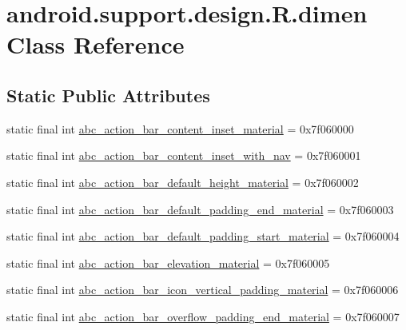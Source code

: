 \hypertarget{classandroid_1_1support_1_1design_1_1R_1_1dimen}{}\section{android.\+support.\+design.\+R.\+dimen Class Reference}
\label{classandroid_1_1support_1_1design_1_1R_1_1dimen}
\subsection*{Static Public Attributes}
\begin{DoxyCompactItemize}
\item 
static final int \mbox{\hyperlink{classandroid_1_1support_1_1design_1_1R_1_1dimen_af42ca9b71c928b25b27c7037a575693b}{abc\+\_\+action\+\_\+bar\+\_\+content\+\_\+inset\+\_\+material}} = 0x7f060000
\item 
static final int \mbox{\hyperlink{classandroid_1_1support_1_1design_1_1R_1_1dimen_ade3bf521e9059c2181c240a1ad284b46}{abc\+\_\+action\+\_\+bar\+\_\+content\+\_\+inset\+\_\+with\+\_\+nav}} = 0x7f060001
\item 
static final int \mbox{\hyperlink{classandroid_1_1support_1_1design_1_1R_1_1dimen_ab992b60379bc68bf6d348760955ad8a6}{abc\+\_\+action\+\_\+bar\+\_\+default\+\_\+height\+\_\+material}} = 0x7f060002
\item 
static final int \mbox{\hyperlink{classandroid_1_1support_1_1design_1_1R_1_1dimen_a25e4e04e667bdfbbf4bcdbced1b7d1b4}{abc\+\_\+action\+\_\+bar\+\_\+default\+\_\+padding\+\_\+end\+\_\+material}} = 0x7f060003
\item 
static final int \mbox{\hyperlink{classandroid_1_1support_1_1design_1_1R_1_1dimen_a0a52034a97ad09c75057adcb3a6022b1}{abc\+\_\+action\+\_\+bar\+\_\+default\+\_\+padding\+\_\+start\+\_\+material}} = 0x7f060004
\item 
static final int \mbox{\hyperlink{classandroid_1_1support_1_1design_1_1R_1_1dimen_a9896c4c4f0debb01001db62e083c80c7}{abc\+\_\+action\+\_\+bar\+\_\+elevation\+\_\+material}} = 0x7f060005
\item 
static final int \mbox{\hyperlink{classandroid_1_1support_1_1design_1_1R_1_1dimen_a45c3c747b19ec74e55fa8033393d1ac8}{abc\+\_\+action\+\_\+bar\+\_\+icon\+\_\+vertical\+\_\+padding\+\_\+material}} = 0x7f060006
\item 
static final int \mbox{\hyperlink{classandroid_1_1support_1_1design_1_1R_1_1dimen_a953114168a0144f2305101244e1eb4bd}{abc\+\_\+action\+\_\+bar\+\_\+overflow\+\_\+padding\+\_\+end\+\_\+material}} = 0x7f060007

\end{DoxyCompactItemize}
